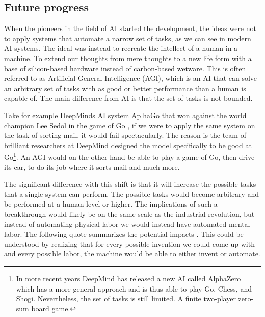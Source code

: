 \documentclass[12pt,A4]{report}
\theoremstyle{definition}
\begin{document}
\subsection{Future progress}
When the pioneers in the field of AI started the development, the ideas were not to apply systems that automate a narrow set of tasks, as we can see in modern AI systems. The ideal was instead to recreate the intellect of a human in a machine\autocite{McCarthy et al.}. To extend our thoughts from mere thoughts to a new life form with a base of silicon-based hardware instead of carbon-based wetware. This is often referred to as Artificial General Intelligence (AGI), which is an AI that can solve an arbitrary set of tasks with as good or better performance than a human is capable of. The main difference from AI is that the set of tasks is not bounded. 

Take for example DeepMinds AI system AplhaGo that won against the world champion Lee Sedol in the game of Go \autocite{DeepMind}, if we were to apply the same system on the task of sorting mail, it would fail spectacularly. The reason is the team of brilliant researchers at DeepMind designed the model specifically to be good at Go\footnote{In more recent years DeepMind has released a new AI called AlphaZero which has a more general approach and is thus able to play Go, Chess, and Shogi\autocite{Deepmind2}. Nevertheless, the set of tasks is still limited. A finite two-player zero-sum board game.}. An AGI would on the other hand be able to play a game of Go, then drive its car, to do its job where it sorts mail and much more. 

The significant difference with this shift is that it will increase the possible tasks that a single system can perform. The possible tasks would become arbitrary and be performed at a human level or higher. The implications of such a breakthrough would likely be on the same scale as the industrial revolution\autocite{Critch Kruger}, but instead of automating physical labor we would instead have automated mental labor. The following quote summarizes the potential impacts \autocite{I.J Good}. This could be understood by realizing that for every possible invention we could come up with and every possible labor, the machine would be able to either invent or automate.
\end{document}
